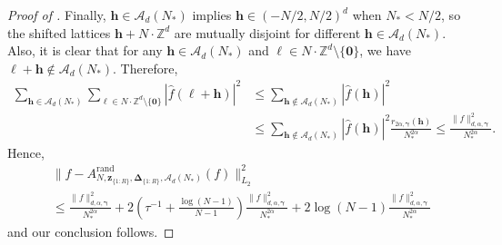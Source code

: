 \documentclass[pdflatex,sn-basic,Numbered]{sn-jnl}%
\newcommand{\rand}{\mathrm{rand}}
\newcommand{\bszero}{\boldsymbol{0}}
\newcommand{\bsh}{\boldsymbol{h}}
\newcommand{\bsl}{\boldsymbol{\ell}}
\newcommand{\bsz}{\boldsymbol{z}}
\newcommand{\bsgamma}{\boldsymbol{\gamma}}
\newcommand{\bsDelta}{\boldsymbol{\Delta}}
\newcommand{\ZZ}{\mathbb{Z}}
\newcommand{\Acal}{\mathcal{A}}
\theoremstyle{thmstyleone}%
\theoremstyle{thmstyletwo}%
\begin{document}
\begin{proof}[Proof of ]
    Finally, $\bsh\in \mathcal{A}_d(N_*)$ implies $\bsh\in (-N/2,N/2)^d$ when $N_*<N/2$, so the shifted lattices $\bsh + N\cdot \ZZ^d$ are mutually disjoint for different $\bsh\in \mathcal{A}_d(N_*)$. Also, it is clear that for any $\bsh\in \mathcal{A}_d(N_*)$ and $\bsl \in N\cdot \ZZ^d\setminus \{\bszero\}$, we have $\bsl+\bsh\not\in \mathcal{A}_d(N_*)$. Therefore, 
    \begin{align*}
        \sum_{\bsh\in \Acal_d(N_*)}\sum_{\bsl \in N\cdot \ZZ^d\setminus \{\bszero\} }|\widehat{f}(\bsl+\bsh)|^2 & \leq \sum_{\bsh\notin \mathcal{A}_d(N_*)} |\widehat{f}(\bsh)|^2\\ & \leq \sum_{\bsh\notin \mathcal{A}_d(N_*)} |\widehat{f}(\bsh)|^2 \frac{r_{2\alpha, \bsgamma}(\bsh) }{N^{2\alpha}_*} \leq \frac{\|f\|^2_{d,\alpha,\bsgamma}}{N^{2\alpha}_*}.
    \end{align*}
    Hence,
    \begin{align*}
        & \|f-A^{\rand}_{N,\bsz_{\{1{:}R\}},\bsDelta_{\{1{:}R\}},\Acal_d(N_*)}(f)\|^2_{L_2}\\
        & \leq \frac{\|f\|^2_{d,\alpha,\bsgamma}}{N^{2\alpha}_*}+2\left(\tau^{-1}+\frac{\log(N-1)}{N-1}\right) \frac{\|f\|^2_{d,\alpha,\bsgamma}}{N^{2\alpha}_*} + 2\log(N-1) \frac{\|f\|^2_{d,\alpha,\bsgamma}}{N^{2\alpha}_*} 
    \end{align*}
    and our conclusion follows.
\end{proof}
\end{document}
